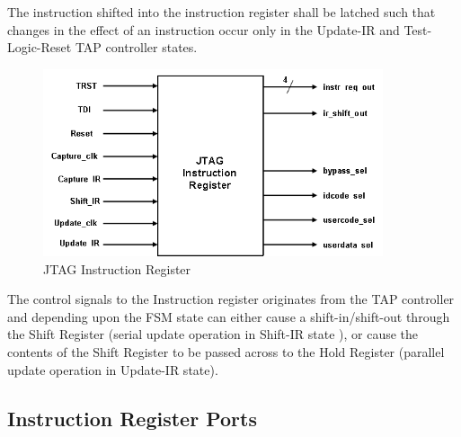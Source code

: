The instruction shifted into the instruction register shall be latched such that \linebreak changes in the effect of an instruction occur only in the Update-IR and Test-Logic-Reset TAP controller states.

\vspace{1cm}
\begin{figure}[H]
    \centering
    \includegraphics[width = 10cm]{images/jtag_instruction_register.png}
    \vspace{1cm}
    \caption{JTAG Instruction Register}
    \label{fig:jtag-instruction-reg}
\end{figure}
\vspace{1cm}

The control signals to the Instruction register originates from the TAP controller and depending upon the FSM state can either cause a shift-in/shift-out through the Shift Register (serial update operation in Shift-IR state ), or cause the contents of the Shift Register to be passed across to the Hold Register (parallel update operation in Update-IR state). 

\subsection{Instruction Register Ports}

